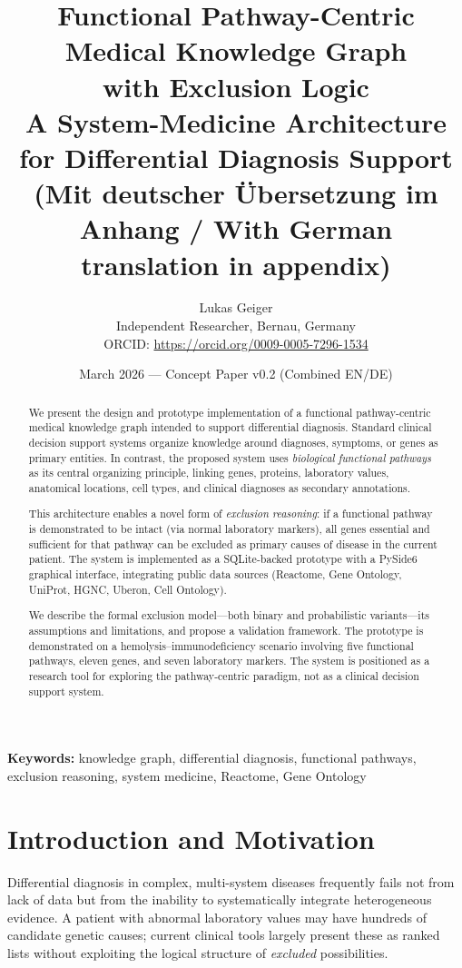 \documentclass[12pt,a4paper]{article}
\title{%
    \textbf{Functional Pathway-Centric Medical Knowledge Graph\\
    with Exclusion Logic}\\[0.5em]
    \large A System-Medicine Architecture for Differential Diagnosis Support\\[0.3em]
    \normalsize (Mit deutscher \"Ubersetzung im Anhang / With German translation in appendix)
}
\author{
    Lukas Geiger\\
    Independent Researcher, Bernau, Germany\\
    ORCID: \url{https://orcid.org/0009-0005-7296-1534}
}
\date{March 2026 --- Concept Paper v0.2 (Combined EN/DE)}
\begin{document}
\maketitle

\begin{abstract}
We present the design and prototype implementation of a functional pathway-centric medical knowledge graph intended to support differential diagnosis. Standard clinical decision support systems organize knowledge around diagnoses, symptoms, or genes as primary entities. In contrast, the proposed system uses \emph{biological functional pathways} as its central organizing principle, linking genes, proteins, laboratory values, anatomical locations, cell types, and clinical diagnoses as secondary annotations.

This architecture enables a novel form of \emph{exclusion reasoning}: if a functional pathway is demonstrated to be intact (via normal laboratory markers), all genes essential and sufficient for that pathway can be excluded as primary causes of disease in the current patient. The system is implemented as a SQLite-backed prototype with a PySide6 graphical interface, integrating public data sources (Reactome, Gene Ontology, UniProt, HGNC, Uberon, Cell Ontology).

We describe the formal exclusion model---both binary and probabilistic variants---its assumptions and limitations, and propose a validation framework. The prototype is demonstrated on a hemolysis--immunodeficiency scenario involving five functional pathways, eleven genes, and seven laboratory markers. The system is positioned as a research tool for exploring the pathway-centric paradigm, not as a clinical decision support system.
\end{abstract}

\smallskip
\noindent\textbf{Keywords:} knowledge graph, differential diagnosis, functional pathways, exclusion reasoning, system medicine, Reactome, Gene Ontology

\section{Introduction and Motivation}
\label{sec:introduction}

Differential diagnosis in complex, multi-system diseases frequently fails not from lack of data but from the inability to systematically integrate heterogeneous evidence. A patient with abnormal laboratory values may have hundreds of candidate genetic causes; current clinical tools largely present these as ranked lists without exploiting the logical structure of \emph{excluded} possibilities.
\end{document}

